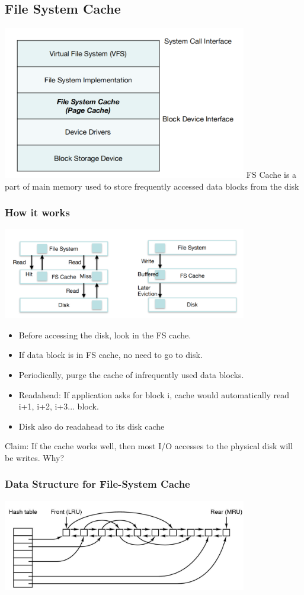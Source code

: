\documentclass[12pt]{article}
\begin{document}
\subsection{File System Cache}
\includegraphics[width=0.8\textwidth]{FileSystemCache.png}
\newline
FS Cache is a part of main memory used to store frequently accessed data blocks from the disk
\subsubsection{How it works}
\includegraphics[width=0.8\textwidth]{HowFileSystemCacheWork.png}
\begin{itemize}
    \item Before accessing the disk, look in the FS cache. 
    \item If data block is in FS cache, no need to go to disk. 
    \item Periodically, purge the cache of infrequently used data blocks.
    \item Readahead: If application asks for block i, cache would automatically read i+1, i+2, i+3... block.
    \item Disk also do readahead to its disk cache
\end{itemize}
Claim: If the cache works well, then most I/O accesses to the physical disk will be writes. Why?
\subsubsection{Data Structure for File-System Cache}
\includegraphics[width=0.8\textwidth]{FileSystemCacheDataStructure.png}
\end{document}
